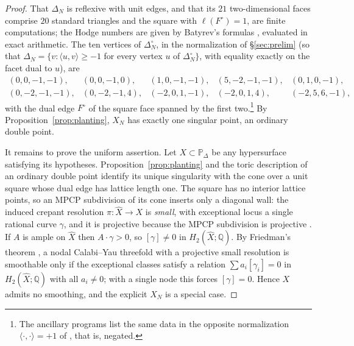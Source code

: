 \documentclass[11pt]{amsart}
\theoremstyle{definition}
\theoremstyle{remark}
\newcommand{\PP}{\mathbb{P}}
\begin{document}
\begin{proof}
That $\Delta_N$ is reflexive with unit edges, and that its $21$
two-dimensional faces comprise $20$ standard triangles and the square
with $\ell(F^\circ)=1$, are finite computations; the Hodge numbers are
given by Batyrev's formulas \cite[\S4]{Batyrev94}, evaluated in exact
arithmetic.  The ten vertices of $\Delta_N^\circ$, in the normalization
of \S\ref{sec:prelim} (so that
$\Delta_N = \{v : \langle u, v\rangle \ge -1$ for every vertex $u$ of
$\Delta_N^\circ\}$, with equality exactly on the facet dual to $u$),
are
\[
\begin{array}{lllll}
(0,0,-1,-1), & (0,0,-1,0), & (1,0,-1,-1), & (5,-2,-1,-1), & (0,1,0,-1),\\[2pt]
(0,-2,-1,-1), & (0,-2,-1,4), & (-2,0,1,-1), & (-2,0,1,4), & (-2,5,6,-1),
\end{array}
\]
with the dual edge $F^\circ$ of the square face spanned by the first
two.\footnote{The ancillary programs list the same data in the opposite
normalization $\langle\cdot,\cdot\rangle=+1$ of \cite{paper1}, that is,
negated.}  By
Proposition~\ref{prop:planting}, $X_N$ has exactly one singular point, an ordinary
double point.

It remains to prove the uniform assertion.  Let $X\subset\PP_\Delta$ be
any hypersurface satisfying its hypotheses.  Proposition~\ref{prop:planting}
and the toric description of an ordinary double point identify its unique
singularity with the cone over a unit square whose dual edge has lattice
length one.  The square has no interior lattice points, so an MPCP
subdivision of its cone inserts only a diagonal wall: the induced crepant
resolution $\pi:\widehat X\to X$ is \emph{small}, with exceptional locus a
single rational curve $\gamma$, and it is projective because the MPCP
subdivision is projective \cite{Batyrev94}.  If $A$ is ample on
$\widehat X$ then $A\cdot\gamma>0$, so
$[\gamma] \neq 0$ in $H_2(\widehat X; \mathbb{Q})$.  By Friedman's theorem
\cite{Friedman86,RollenskeThomas}, a nodal
Calabi--Yau threefold with a projective small resolution is smoothable
only if the exceptional classes
satisfy a relation $\sum a_i [\gamma_i] = 0$ in
$H_2(\widehat X;\mathbb{Q})$ with all $a_i \neq 0$; with a
single node this forces $[\gamma] = 0$.  Hence $X$ admits no smoothing,
and the explicit $X_N$ is a special case.
\end{proof}
\end{document}

